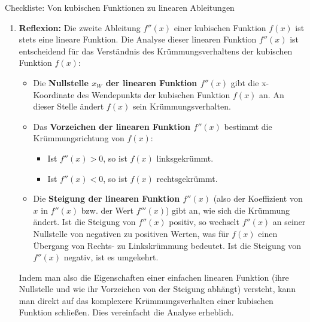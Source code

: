 \begin{loesungsumgebung}{Checkliste: Von kubischen Funktionen zu linearen Ableitungen}
\begin{enumerate}[label=(\alph*)]
    \item \textbf{Reflexion:}
    Die zweite Ableitung $f''(x)$ einer kubischen Funktion $f(x)$ ist stets eine lineare Funktion. Die Analyse dieser linearen Funktion $f''(x)$ ist entscheidend für das Verständnis des Krümmungsverhaltens der kubischen Funktion $f(x)$:
    \begin{itemize}
        \item Die \textbf{Nullstelle $x_W$ der linearen Funktion $f''(x)$} gibt die x-Koordinate des Wendepunkts der kubischen Funktion $f(x)$ an. An dieser Stelle ändert $f(x)$ sein Krümmungsverhalten.
        \item Das \textbf{Vorzeichen der linearen Funktion $f''(x)$} bestimmt die Krümmungsrichtung von $f(x)$:
        \begin{itemize}
            \item Ist $f''(x) > 0$, so ist $f(x)$ linksgekrümmt.
            \item Ist $f''(x) < 0$, so ist $f(x)$ rechtsgekrümmt.
        \end{itemize}
        \item Die \textbf{Steigung der linearen Funktion $f''(x)$} (also der Koeffizient von $x$ in $f''(x)$ bzw. der Wert $f'''(x)$) gibt an, wie sich die Krümmung ändert. Ist die Steigung von $f''(x)$ positiv, so wechselt $f''(x)$ an seiner Nullstelle von negativen zu positiven Werten, was für $f(x)$ einen Übergang von Rechts- zu Linkskrümmung bedeutet. Ist die Steigung von $f''(x)$ negativ, ist es umgekehrt.
    \end{itemize}
    Indem man also die Eigenschaften einer einfachen linearen Funktion (ihre Nullstelle und wie ihr Vorzeichen von der Steigung abhängt) versteht, kann man direkt auf das komplexere Krümmungsverhalten einer kubischen Funktion schließen. Dies vereinfacht die Analyse erheblich.
\end{enumerate}

\end{loesungsumgebung}

